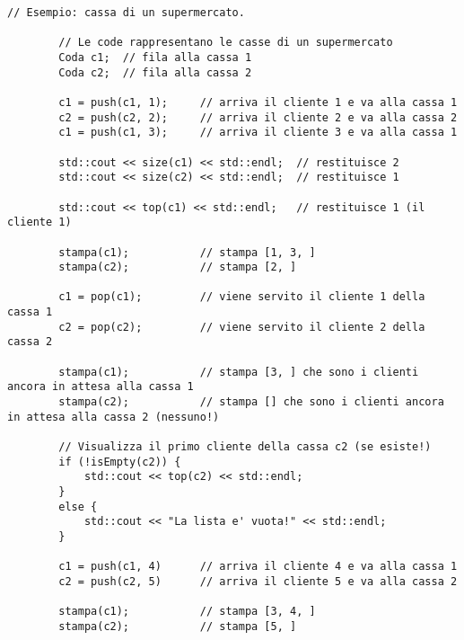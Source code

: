 \documentclass[addpoints,12pt,answers]{exam}
\begin{document}
    \begin{lstlisting}[style=verbatim]
        // Esempio: cassa di un supermercato.

        // Le code rappresentano le casse di un supermercato
        Coda c1;  // fila alla cassa 1
        Coda c2;  // fila alla cassa 2

        c1 = push(c1, 1);     // arriva il cliente 1 e va alla cassa 1
        c2 = push(c2, 2);     // arriva il cliente 2 e va alla cassa 2
        c1 = push(c1, 3);     // arriva il cliente 3 e va alla cassa 1

        std::cout << size(c1) << std::endl;  // restituisce 2
        std::cout << size(c2) << std::endl;  // restituisce 1

        std::cout << top(c1) << std::endl;   // restituisce 1 (il cliente 1)

        stampa(c1);           // stampa [1, 3, ]
        stampa(c2);           // stampa [2, ]

        c1 = pop(c1);         // viene servito il cliente 1 della cassa 1
        c2 = pop(c2);         // viene servito il cliente 2 della cassa 2

        stampa(c1);           // stampa [3, ] che sono i clienti ancora in attesa alla cassa 1
        stampa(c2);           // stampa [] che sono i clienti ancora in attesa alla cassa 2 (nessuno!)

        // Visualizza il primo cliente della cassa c2 (se esiste!)
        if (!isEmpty(c2)) {
            std::cout << top(c2) << std::endl;
        }
        else {
            std::cout << "La lista e' vuota!" << std::endl;
        }

        c1 = push(c1, 4)      // arriva il cliente 4 e va alla cassa 1
        c2 = push(c2, 5)      // arriva il cliente 5 e va alla cassa 2

        stampa(c1);           // stampa [3, 4, ]
        stampa(c2);           // stampa [5, ]
    \end{lstlisting}
    
\end{document}
